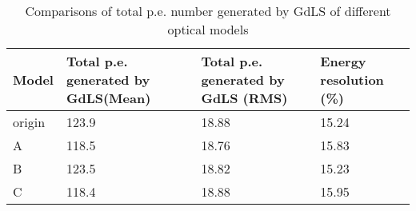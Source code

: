 \begin{table}
\centering
\caption{Comparisons of total p.e. number generated by GdLS of different optical models}
\label{tab:peGenGdLSOpModel}
\begin{tabular}{lp{3.0cm}p{3.0cm}p{3.0cm}}
Model  &  Total p.e. generated by GdLS(Mean)  &    Total p.e. generated by GdLS (RMS) &     Energy resolution (\%) \\
\hline
\hline
origin & 123.9 &  18.88 &  15.24 \\
A  &  118.5 &  18.76 &  15.83 \\
B  & 123.5  & 18.82  & 15.23 \\
C  & 118.4  & 18.88  & 15.95 \\
\hline
\end{tabular}
\end{table}

